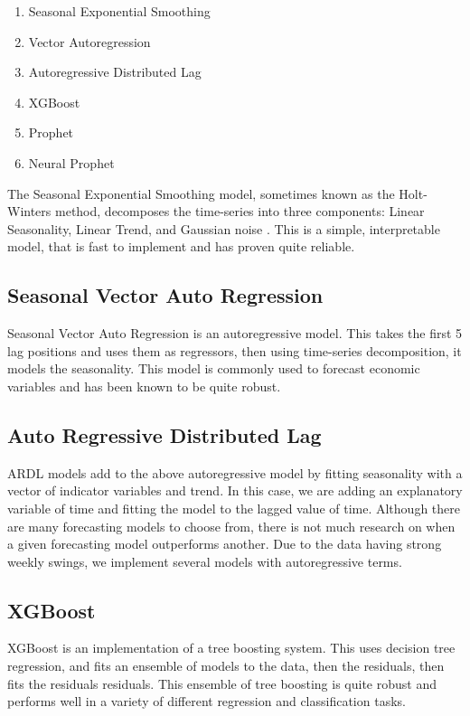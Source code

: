\documentclass[16pt,twocolumn,letterpaper,titlepage]{article}
\begin{document}
\begin{enumerate}
\item Seasonal Exponential Smoothing
\item Vector Autoregression
\item Autoregressive Distributed Lag
\item XGBoost 
\item Prophet
\item Neural Prophet
\end{enumerate}


The Seasonal Exponential Smoothing model, sometimes known as the Holt-Winters method, decomposes the time-series into three components: Linear Seasonality, Linear Trend, and Gaussian noise \cite{hyndman2018forecasting}. This is a simple, interpretable model, that is fast to implement and has proven quite reliable.

\subsection{Seasonal Vector Auto Regression}

Seasonal Vector Auto Regression is an autoregressive model. This takes the first 5 lag positions and uses them as regressors, then using time-series decomposition, it models the seasonality\cite{hamilton1994}. This model is commonly used to forecast economic variables and has been known to be quite robust.

\subsection{Auto Regressive Distributed Lag}

ARDL models add to the above autoregressive model by fitting seasonality with a vector of indicator variables and trend. In this case, we are adding an explanatory variable of time and fitting the model to the lagged value of time. Although there are many forecasting models to choose from, there is not much research on when a given forecasting model outperforms another. Due to the data having strong weekly swings, we implement several models with autoregressive terms.


\subsection{XGBoost}

XGBoost is an implementation of a tree boosting system. This uses decision tree regression, and fits an ensemble of models to the data, then the residuals, then fits the residuals residuals. This ensemble of tree boosting is quite robust and performs well in a variety of different regression and classification tasks\cite{chen2015xgboost}.
\end{document}
